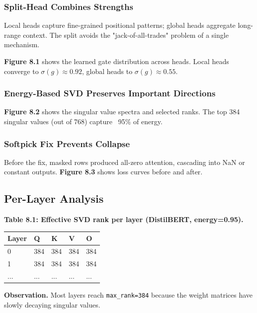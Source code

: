 \subsubsection{Split-Head Combines Strengths}

Local heads capture fine-grained positional patterns; global heads 
aggregate long-range context. The split avoids the "jack-of-all-trades" 
problem of a single mechanism.

\textbf{Figure 8.1} shows the learned gate distribution across heads. Local 
heads converge to $\sigma(g) \approx 0.92$, global heads to 
$\sigma(g) \approx 0.55$.

\subsubsection{Energy-Based SVD Preserves Important Directions}

\textbf{Figure 8.2} shows the singular value spectra and selected ranks. The 
top 384 singular values (out of 768) capture ~95\% of energy.

\subsubsection{Softpick Fix Prevents Collapse}

Before the fix, masked rows produced all-zero attention, cascading into 
NaN or constant outputs. \textbf{Figure 8.3} shows loss curves before and after.

\subsection{Per-Layer Analysis}

\textbf{Table 8.1: Effective SVD rank per layer (DistilBERT, energy=0.95).}

\begin{table}[H]
\centering
\small
\begin{tabular}{lllll}
\toprule
\textbf{Layer} & \textbf{Q} & \textbf{K} & \textbf{V} & \textbf{O} \\
\midrule
0 & 384 & 384 & 384 & 384 \\
1 & 384 & 384 & 384 & 384 \\
... & ... & ... & ... & ... \\
\bottomrule
\end{tabular}
\end{table}

\textbf{Observation.} Most layers reach \texttt{max\_rank=384} because the weight 
matrices have slowly decaying singular values.

